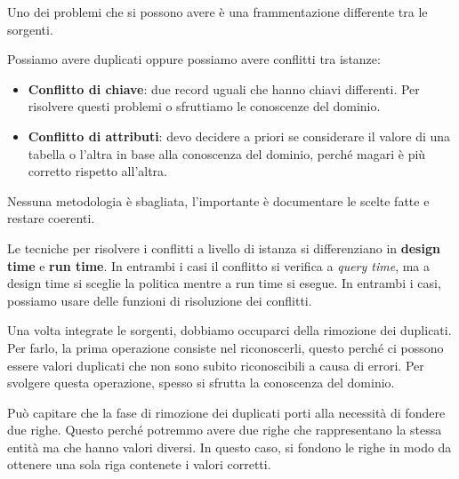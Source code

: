 Uno dei problemi che si possono avere è una frammentazione differente tra le
sorgenti.

Possiamo avere duplicati oppure possiamo avere conflitti tra istanze:
\begin{itemize}
      \item \textbf{Conflitto di chiave}: due record uguali che hanno chiavi
            differenti. Per risolvere questi problemi o sfruttiamo le conoscenze
            del dominio.
      \item \textbf{Conflitto di attributi}: devo decidere a priori se considerare
            il valore di una tabella o l'altra in base alla conoscenza del dominio,
            perché magari è più corretto rispetto all'altra.
\end{itemize}
\begin{nota}
      Nessuna metodologia è sbagliata, l'importante è documentare le scelte fatte
      e restare coerenti.
\end{nota}
Le tecniche per risolvere i conflitti a livello di istanza si differenziano in
\textbf{design time} e \textbf{run time}. In entrambi i casi il conflitto si
verifica a \textit{query time}, ma a design time si sceglie la politica mentre a
run time si esegue. In entrambi i casi, possiamo usare delle funzioni di
risoluzione dei conflitti.

Una volta integrate le sorgenti, dobbiamo occuparci della rimozione dei duplicati.
Per farlo, la prima operazione consiste nel riconoscerli, questo perché ci possono
essere valori duplicati che non sono subito riconoscibili a causa di errori.
Per svolgere questa operazione, spesso si sfrutta la conoscenza del dominio.

Può capitare che la fase di rimozione dei duplicati porti alla necessità di
fondere due righe. Questo perché potremmo avere due righe che rappresentano la
stessa entità ma che hanno valori diversi. In questo caso, si fondono le righe
in modo da ottenere una sola riga contenete i valori corretti.


